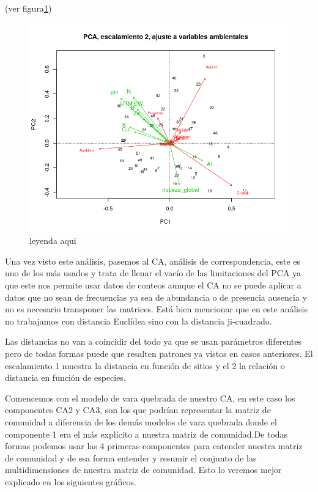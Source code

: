 \documentclass[11pt,]{article}
\begin{document}
(ver figura\ref{fig:variables_numericas})

\begin{figure}
\centering
\includegraphics{variables_numericas.png}
\caption{\label{fig:variables_numericas}leyenda aqui}
\end{figure}

Una vez visto este análisis, pasemos al CA, análisis de correspondencia,
este es uno de los más usados y trata de llenar el vacío de las
limitaciones del PCA ya que este nos permite usar datos de conteos
aunque el CA no se puede aplicar a datos que no sean de frecuencias ya
sea de abundancia o de presencia ausencia y no es necesario transponer
las matrices. Está bien mencionar que en este análisis no trabajamos con
distancia Euclídea sino con la distancia ji-cuadrado.

Las distancias no van a coincidir del todo ya que se usan parámetros
diferentes pero de todas formas puede que resalten patrones ya vistos en
casos anteriores. El escalamiento 1 muestra la distancia en función de
sitios y el 2 la relación o distancia en función de especies.

Comencemos con el modelo de vara quebrada de nuestro CA, en este caso
los componentes CA2 y CA3, son los que podrían representar la matriz de
comunidad a diferencia de los demás modelos de vara quebrada donde el
componente 1 era el más explícito a nuestra matriz de comunidad.De todas
formas podemos usar las 4 primeras componentes para entender nuestra
matriz de comunidad y de esa forma entender y resumir el conjunto de las
multidimensiones de nuestra matriz de comunidad. Esto lo veremos mejor
explicado en los siguientes gráficos.
\end{document}
